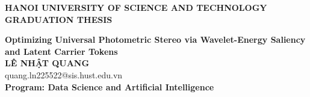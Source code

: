 \documentclass[Main.tex]{subfiles}
\begin{document}
\begin{titlepage}
\thispagestyle{empty}
\begin{center}

{\textbf{\large{HANOI UNIVERSITY OF SCIENCE AND TECHNOLOGY }}}\\[4cm]

{\textbf{\huge{GRADUATION THESIS}}}\\[1cm]
{\textbf{\Large{Optimizing Universal Photometric Stereo via Wavelet-Energy Saliency and Latent Carrier Tokens}}\\[1cm]

{\textbf{\large{LÊ NHẬT QUANG}}}\\
{\large{quang.ln225522@sis.hust.edu.vn}}\\[0.5cm]

{\textbf{\large{Program: Data Science and Artificial Intelligence}}}\\

\vspace{4cm}
\begin{table}[H]
\centering
{}
\end{table}}
\end{center}

\end{titlepage}
\end{document}
